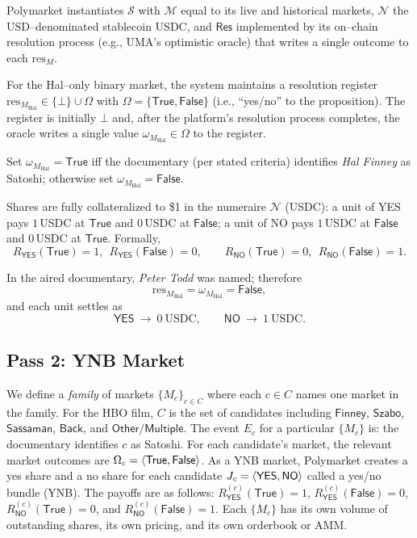 Polymarket instantiates $\mathcal{S}$ with $\mathcal{M}$ equal to its live and historical markets, $\mathcal{N}$ the USD–denominated stablecoin USDC, and $\mathsf{Res}$ implemented by its on–chain resolution process (e.g., UMA’s optimistic oracle) that writes a single outcome to each $\mathrm{res}_M$.

For the Hal–only binary market, the system maintains a resolution register
$\mathrm{res}_{M_{\mathrm{Hal}}}\in\{\bot\}\cup\Omega$ with
$\Omega=\{\mathsf{True},\mathsf{False}\}$ (i.e., “yes/no” to the proposition).
The register is initially $\bot$ and, after the platform’s resolution process completes, the oracle writes a single value
$\omega_{M_{\mathrm{Hal}}}\in\Omega$ to the register.

Set $\omega_{M_{\mathrm{Hal}}}=\mathsf{True}$ iff the documentary (per stated criteria) identifies \emph{Hal Finney} as Satoshi; otherwise set $\omega_{M_{\mathrm{Hal}}}=\mathsf{False}$.

Shares are fully collateralized to \$1 in the numeraire $\mathcal{N}$ (USDC): a unit of \textsf{YES} pays $1$\,USDC at $\mathsf{True}$ and $0$\,USDC at $\mathsf{False}$; a unit of \textsf{NO} pays $1$\,USDC at $\mathsf{False}$ and $0$\,USDC at $\mathsf{True}$. Formally,
\[
R_{\textsf{YES}}(\mathsf{True})=1,\ \ R_{\textsf{YES}}(\mathsf{False})=0,\qquad
R_{\textsf{NO}}(\mathsf{True})=0,\ \ R_{\textsf{NO}}(\mathsf{False})=1.
\]

In the aired documentary, \emph{Peter Todd} was named; therefore
\[
\mathrm{res}_{M_{\mathrm{Hal}}}=\omega_{M_{\mathrm{Hal}}}=\mathsf{False},
\]
and each unit settles as
\[
\textsf{YES}\ \to\ 0\ \text{USDC},\qquad
\textsf{NO}\ \to\ 1\ \text{USDC}.
\]


\subsection{Pass 2: YNB Market}

We define a \textit{family} of markets $\{M_c\}_{c\in C}$ where each $c\in C$ names one market in the family. For the HBO film, $C$ is the set of candidates including $\mathsf{Finney}$, $\mathsf{Szabo}$,  $\mathsf{Sassaman}$,  $\mathsf{Back}$, and $\mathsf{Other/Multiple}$. The event $E_c$ for a particular $\{M_c\}$ is: the documentary identifies $c$ as Satoshi. For each candidate's market, the relevant market outcomes are $\Omega_c=\left \langle \mathsf{True},\mathsf{False} \right \rangle$. As a YNB market, Polymarket creates a yes share and a no share for each candidate $J_c=\left \langle \textsf{YES},\textsf{NO} \right \rangle$ called a yes/no bundle (YNB). The payoffs are as follows: $R^{(c)}_{\textsf{YES}}(\mathsf{True})=1$, $R^{(c)}_{\textsf{YES}}(\mathsf{False})=0$, $R^{(c)}_{\textsf{NO}}(\mathsf{True})=0$, and $R^{(c)}_{\textsf{NO}}(\mathsf{False})=1$. Each $\{M_c\}$ has its own volume of outstanding shares, its own pricing, and its own orderbook or AMM. 

